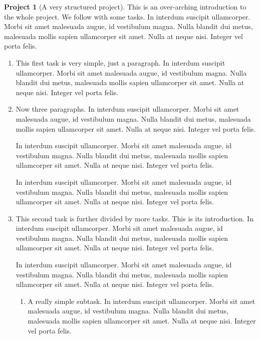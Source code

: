 \documentclass{amsart}
\theoremstyle{plain}%
\theoremstyle{definition}%
\newtheorem{project}[theorem]{Project}
\theoremstyle{remark}%
\numberwithin{equation}{section}
\begin{document}
\begin{project}[A very structured project]\label{project-structured}%
%
This is an over-arching introduction to the whole project.  We follow with some tasks.  In interdum suscipit ullamcorper. Morbi sit amet malesuada augue, id vestibulum magna. Nulla blandit dui metus, malesuada mollis sapien ullamcorper sit amet. Nulla at neque nisi. Integer vel porta felis.%
\begin{enumerate}[font=\bfseries,label=(\alph*),ref=\alph*]%
\item{}This first task is very simple, just a paragraph.  In interdum suscipit ullamcorper. Morbi sit amet malesuada augue, id vestibulum magna. Nulla blandit dui metus, malesuada mollis sapien ullamcorper sit amet. Nulla at neque nisi. Integer vel porta felis.%
\item{}Now three paragraphs.  In interdum suscipit ullamcorper. Morbi sit amet malesuada augue, id vestibulum magna. Nulla blandit dui metus, malesuada mollis sapien ullamcorper sit amet. Nulla at neque nisi. Integer vel porta felis.%
\par
In interdum suscipit ullamcorper. Morbi sit amet malesuada augue, id vestibulum magna. Nulla blandit dui metus, malesuada mollis sapien ullamcorper sit amet. Nulla at neque nisi. Integer vel porta felis.%
\par
In interdum suscipit ullamcorper. Morbi sit amet malesuada augue, id vestibulum magna. Nulla blandit dui metus, malesuada mollis sapien ullamcorper sit amet. Nulla at neque nisi. Integer vel porta felis.%
\item{}This second task is further divided by more tasks.  This is its introduction.  In interdum suscipit ullamcorper. Morbi sit amet malesuada augue, id vestibulum magna. Nulla blandit dui metus, malesuada mollis sapien ullamcorper sit amet. Nulla at neque nisi. Integer vel porta felis.%
\par
In interdum suscipit ullamcorper. Morbi sit amet malesuada augue, id vestibulum magna. Nulla blandit dui metus, malesuada mollis sapien ullamcorper sit amet. Nulla at neque nisi. Integer vel porta felis.%
\begin{enumerate}[font=\bfseries,label=(\roman*),ref=\theenumi.\roman*]%
\item{}A really simple subtask.  In interdum suscipit ullamcorper. Morbi sit amet malesuada augue, id vestibulum magna. Nulla blandit dui metus, malesuada mollis sapien ullamcorper sit amet. Nulla at neque nisi. Integer vel porta felis.%
\par

\end{enumerate}
\end{enumerate}
\end{project}
\end{document}

